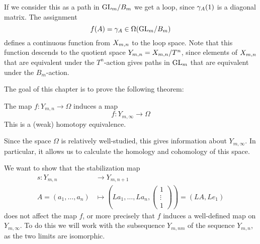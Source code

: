 If we consider this as a path in $\mathrm{GL}_{m}/B_{m}$ we
get a loop, since $\gamma_A(1)$ is a diagonal matrix. The
assignment
\[ f(A) = \gamma_A \in \Omega(\mathrm{GL}_{m}/B_{m}) \]
defines a continuous function from $X_{m,n}$ to the loop space. Note that
this function descends to the quotient space $Y_{m,n}=X_{m,n}/T^n$, since
elements of $X_{m,n}$ that are equivalent under the $T^n$-action gives
paths in $\mathrm{GL}_m$ that are equivalent under the $B_m$-action.

The goal of this chapter is to prove the following theorem:

\begin{theorem}
  The map $f : Y_{m,n} \to \Omega$ induces a map
  \[ f : Y_{m,\infty} \to \Omega \]
  This is a (weak) homotopy equivalence.
\end{theorem}

Since the space $\Omega$ is relatively well-studied, this gives
information about $Y_{m,\infty}$. In particular, it allows us to
calculate the homology and cohomology of this space.

We want to show that the stabilization map
\begin{align*}
  s : Y_{m,n} &\to Y_{m,n+1} \\
  A = (a_1,\dots,a_n) &\mapsto \left(La_1,\dots,La_n,
    \begin{pmatrix}
      1 \\
      \vdots\\
      1
    \end{pmatrix} 
\right) = (LA,Le_1)
\end{align*}
does not affect the map $f$, or more precisely that $f$ induces a
well-defined map on $Y_{m,\infty}$. To do this we will work with the
subsequence $Y_{m,nm}$ of the sequence $Y_{m,n}$, as the two limits
are isomorphic.

